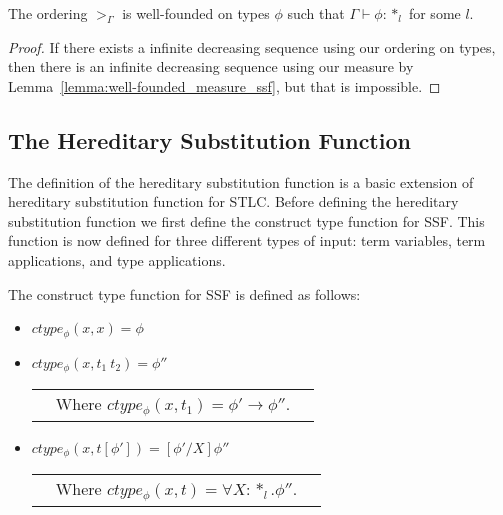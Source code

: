 \begin{thm}
  The ordering $>_\Gamma$ is well-founded on types $\phi$ such that 
  $\Gamma \vdash \phi:*_l$ for some $l$.
  \label{thm:well-founded_ordering_ssf}
\end{thm}
\begin{proof}
  If there exists a infinite decreasing sequence using our ordering on types,
  then there is an infinite decreasing sequence using our measure by 
  Lemma~\ref{lemma:well-founded_measure_ssf}, but that is impossible.
\end{proof}

\subsection{The Hereditary Substitution Function}
\label{subsec:the_hereditary_substitution_function}
The definition of the hereditary substitution function is a basic
extension of hereditary substitution function for STLC.  Before
defining the hereditary substitution function we first define the
construct type function for SSF.  This function is now defined for
three different types of input: term variables, term applications, and
type applications.
\begin{definition}
  \label{def:ctype_function_ssf}
  The construct type function for SSF is defined as follows:
  \begin{itemize}
  \item[] $ctype_\phi(x,x) = \phi$
  \item[] $ctype_\phi(x,t_1\ t_2) = \phi''$\\
    \begin{tabular}{lll}
      & Where $ctype_\phi(x,t_1) = \phi' \to \phi''$.
    \end{tabular}    
  \item[] $ctype_\phi(x,t[\phi']) = [\phi'/X]\phi''$\\
    \begin{tabular}{lll}
      & Where $ctype_\phi(x,t) = \forall X:*_l.\phi''$.
    \end{tabular}    
  \end{itemize}
\end{definition}

